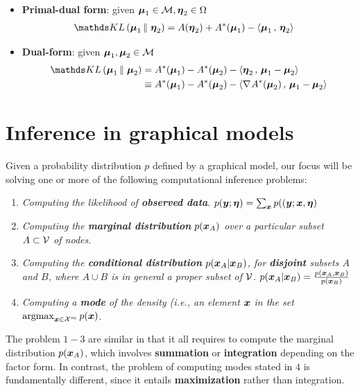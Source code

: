 \documentclass[11pt]{article}
\begin{document}
\begin{itemize}
\begin{itemize}
\item \textbf{Primal-dual form}: given $\boldsymbol{\mu}_1 \in {\mathcal M}, \boldsymbol{\eta}_2 \in \Omega$
\begin{align}
 \kl{\mb{\mu}_1}{\mb{\eta}_2} &= A(\mb{\eta}_2) + A^{*}(\mb{\mu}_1) - \inn{\mb{\mu}_{1}}{\mb{\eta}_2}  \label{eqn: kl_primal_dual}
\end{align}

\item \textbf{Dual-form}: given $\boldsymbol{\mu}_1, \boldsymbol{\mu}_2  \in {\mathcal M}$
\begin{align}
 \kl{\mb{\mu}_1}{\mb{\mu}_2} &= A^{*}(\mb{\mu}_1) - A^{*}(\mb{\mu}_{2}) - \inn{\mb{\eta}_2}{\mb{\mu}_{1} - \mb{\mu}_{2}}  \label{eqn: kl_dual} \\
 &\equiv  A^{*}(\mb{\mu}_1) - A^{*}(\mb{\mu}_{2}) - \inn{\grad{}{A^{*}}(\mb{\mu}_{2})}{\mb{\mu}_{1} - \mb{\mu}_{2}} \nonumber
\end{align}
\end{itemize}
\end{itemize}


\section{Inference in graphical models}
Given a probability distribution $p$ defined by a graphical model, our focus will be solving one or more of the following computational inference problems:
\begin{enumerate}
\item \emph{Computing the likelihood of \textbf{observed data}}. $p(\boldsymbol{y}; \boldsymbol{\eta}) = \sum_{\boldsymbol{x}}p((\boldsymbol{y}; \boldsymbol{x}, \boldsymbol{\eta})$

\item \emph{Computing the \textbf{marginal distribution} $p(\boldsymbol{x}_{A})$ over a particular subset $A \subset {\mathcal V}$ of nodes}.

\item \emph{Computing the \textbf{conditional distribution} $p(\boldsymbol{x}_{A} | \boldsymbol{x}_{B})$, for \textbf{disjoint} subsets $A$ and $B$, where $A \cup B$ is in general a proper
subset of ${\mathcal V}$}. $p(\boldsymbol{x}_{A} | \boldsymbol{x}_{B}) = \frac{p(\boldsymbol{x}_{A} , \boldsymbol{x}_{B})}{p(\boldsymbol{x}_{B})}$

\item \emph{Computing a \textbf{mode} of the density (i.e., an element $\boldsymbol{x}$ in the set $\operatorname{argmax}_{\boldsymbol{x}\in {\mathcal X}^m} p(\boldsymbol{x})$}.
\end{enumerate}

The problem $1-3$ are similar in that it all requires to compute the marginal distribution $p(\boldsymbol{x}_{A})$, which involves \textbf{summation} or \textbf{integration} depending on the factor form. In contrast, the problem of computing modes stated in $4$ is fundamentally different, since it entails \textbf{maximization} rather than integration. 
\end{document}
